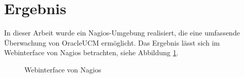 \section{Ergebnis}

In dieser Arbeit wurde ein Nagios-Umgebung realisiert, die eine umfassende Überwachung von \gls{OracleUCM} ermöglicht.
Das Ergebnis lässt sich im Webinterface von Nagios betrachten, siehe Abbildung \ref{nweb}.



\begin{figure}[ht]
	\centering
		\caption{Webinterface von Nagios}
		\label{nweb}
\end{figure}

